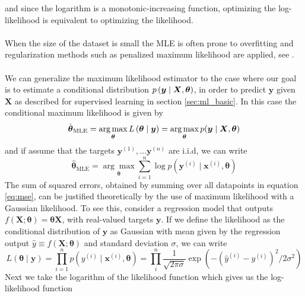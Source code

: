 and since the logarithm is a monotonic-increasing function, optimizing the log-likelihood is equivalent to optimizing the likelihood. 
\\
\\
When the size of the dataset is small the MLE is often prone to overfitting and regularization methods such as penalized maximum likelihood are applied, see \cite{hastie01statisticallearning}.
\\
\\
We can generalize the maximum likelihood estimator to the case where our goal is to estimate a conditional distribution $p\left (\boldsymbol{y}\mid \boldsymbol{X},\boldsymbol{\theta}\right)$, in order to predict $\boldsymbol{y}$ given $\boldsymbol{X}$ as described for supervised learning in section \ref{sec:ml_basic}. In this case the conditional maximum likelihood is given by
\begin{equation*}
    \hat{\boldsymbol{\theta}}_{\text{MLE}}=\operatorname*{arg\,max}_{\boldsymbol{\theta}}L\left (\boldsymbol{\theta}\mid \boldsymbol{y}\right)=\operatorname*{arg\,max}_{\boldsymbol{\theta}} p(\boldsymbol{y} \mid \boldsymbol{X}, \boldsymbol{\theta})
\end{equation*}
and if assume that the targets $\boldsymbol{y}^{(1)},\ldots \boldsymbol{y}^{(n)}$ are i.i.d, we can write
\begin{equation*}
    \hat{\boldsymbol{\theta}}_{\text{MLE}}=\underset{\boldsymbol{\theta}}{\arg \max } \sum_{i=1}^{n} \log p\left(\boldsymbol{y}^{(i)} \mid \boldsymbol{x}^{(i)},\boldsymbol{\theta}\right)
\end{equation*}
The sum of squared errors, obtained by summing over all datapoints in equation \ref{eq:mse}, can be justified theoretically by the use of maximum likelihood with a Gaussian likelihood.
To see this, consider a regression model that outputs $f(\boldsymbol{X};\boldsymbol{\theta})=\boldsymbol{\theta}\boldsymbol{X}$, with real-valued targets $\boldsymbol{y}$. If we define the likelihood as the conditional distribution of $\boldsymbol{y}$ as Gaussian with mean given by the regression output $\hat{y}\equiv f(\boldsymbol{X};\boldsymbol{\theta})$ and standard deviation $\sigma$, we can write
\begin{equation*}
    L(\boldsymbol{\theta}\mid \boldsymbol{y})=\prod_{i=1}^{n} p\left(y^{(i)} \mid \boldsymbol{x}^{(i)} , \boldsymbol{\theta}\right)=\prod_i^n\frac{1}{\sqrt{2\pi\sigma}}\exp\left(-(\hat{y}^{(i)}-y^{(i)})^2/2\sigma^2\right)
\end{equation*}
Next we take the
logarithm of the likelihood function which gives us the log-likelihood function
